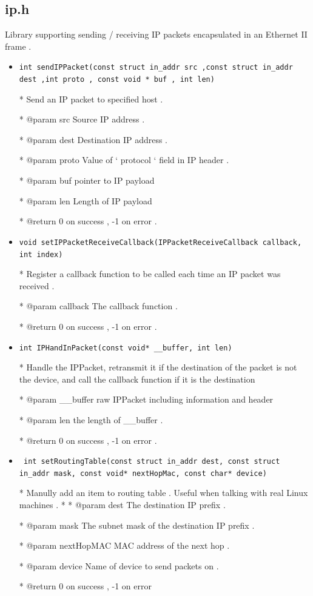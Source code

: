 \documentclass[11pt]{article}
\begin{document}
	\subsection*{ip.h}
	
	\par Library supporting sending / receiving IP packets encapsulated	in an Ethernet II frame .
	
	\begin{itemize}
		\item \texttt{int sendIPPacket(const struct in\_addr src ,const struct in\_addr dest ,int proto , const void * buf , int len)} 
		
		* Send an IP packet to specified host .
		
		* @param src Source IP address .
		
		* @param dest Destination IP address .
		
		* @param proto Value of ‘ protocol ‘ field in IP header .
		
		* @param buf pointer to IP payload
		
		* @param len Length of IP payload
		
		* @return 0 on success , -1 on error .
		
		 \item \texttt{void setIPPacketReceiveCallback(IPPacketReceiveCallback callback, int index)}
		 
		 * Register a callback function to be called each time an IP
		 packet was received .
		 
		 * @param callback The callback function .
		 
		 * @return 0 on success , -1 on error .
		
		\item \texttt{int IPHandInPacket(const void* \_\_buffer, int len)}
		
		* Handle the IPPacket, retransmit it if the destination of the packet is not the device,
		and call the callback function if it is the destination
		
		* @param \_\_buffer raw IPPacket including information and header
		
		* @param len the length of \_\_buffer .
		
		* @return 0 on success , -1 on error .
		
		\item \texttt{
			int setRoutingTable(const struct in\_addr dest, const struct in\_addr mask,
			const void* nextHopMac, const char* device)}
			
			* Manully add an item to routing table . Useful when talking
			with real Linux machines .
			*
			* @param dest The destination IP prefix .
			
			* @param mask The subnet mask of the destination IP prefix .
			
			* @param nextHopMAC MAC address of the next hop .
			
			* @param device Name of device to send packets on .
			
			* @return 0 on success , -1 on error
	\end{itemize}
\end{document}
